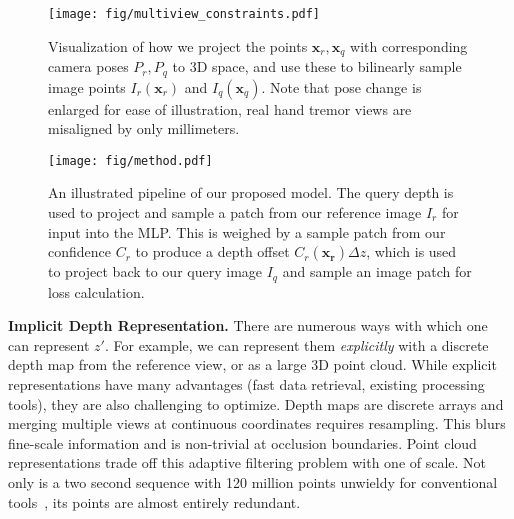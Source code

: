 \begin{figure}[t]
    \centering
    \texttt{[image: fig/multiview\_constraints.pdf]}
    \caption{Visualization of how we project the points $\bm{x}_r,\bm{x}_q$ with corresponding camera poses $P_r,P_q$ to 3D space, and use these to bilinearly sample image points $I_r(\bm{x}_r)$ and $I_q(\bm{x}_q)$. Note that pose change is enlarged for ease of illustration, real hand tremor views are misaligned by only millimeters. }
    \label{fig:parallax_constraints}
    \vspace{-1em}
\end{figure}

\begin{figure*}[t]
    \centering
    \texttt{[image: fig/method.pdf]}
    \caption{An illustrated pipeline of our proposed model. The query depth is used to project and sample a patch from our reference image $I_r$ for input into the MLP. This is weighed by a sample patch from our confidence $C_r$ to produce a depth offset $C_r(\bm{x_r})\Delta z$, which is used to project back to our query image $I_q$ and sample an image patch for loss calculation.}
    \label{fig:method}
    \vspace{-1em}
\end{figure*}

\vspace{0.5em}\noindent\textbf{Implicit Depth Representation.}\hspace{0.1em} There are numerous ways with which one can represent $z'$. For example, we can represent them \emph{explicitly} with a discrete depth map from the reference view, or as a large 3D point cloud. While explicit representations have many advantages (fast data retrieval, existing processing tools), they are also challenging to optimize. Depth maps are discrete arrays and merging multiple views at continuous coordinates requires resampling. This blurs fine-scale information and is non-trivial at occlusion boundaries. Point cloud representations trade off this adaptive filtering problem with one of scale. Not only is a two second sequence with 120 million points unwieldy for conventional tools~\cite{arun1987least}, its points are almost entirely redundant.


